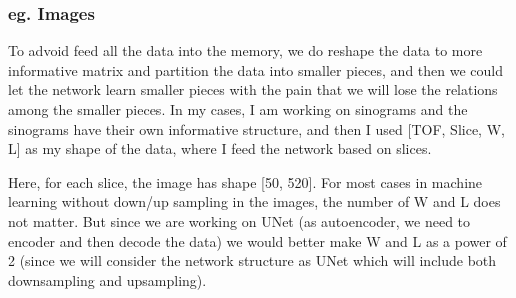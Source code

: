 \documentclass[letterpaper,10pt,english]{sphinxmanual}
\begin{document}
\subsubsection{eg. Images}
\label{\detokenize{usage/data:eg-images}}
\noindent{}

To advoid feed all the data into the memory, we do reshape the data to more informative matrix and partition the data into smaller pieces, and then we could let the network learn smaller pieces with the pain that we will lose the relations among the smaller pieces. In my cases, I am working on sinograms and the sinograms have their own informative structure, and then I used {[}TOF, Slice, W, L{]} as my shape of the data, where I feed the network based on slices.

Here, for each slice, the image has shape {[}50, 520{]}. For most cases in machine learning without down/up sampling in the images, the number of W and L does not matter. But since we are working on UNet (as autoencoder, we need to encoder and then decode the data) we would better make W and L as a power of 2 (since we will consider the network structure as UNet which will include both downsampling and upsampling).
\end{document}
